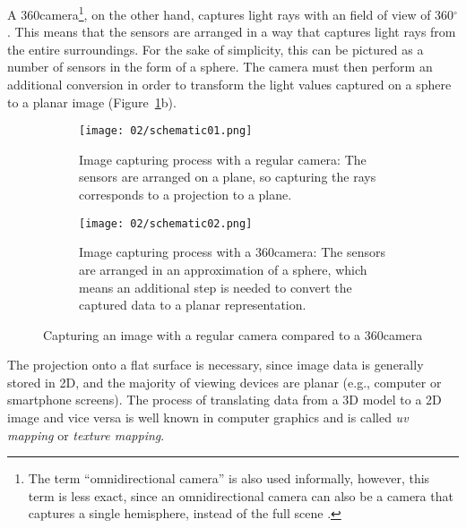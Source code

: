 A 360\degree camera\footnote{The term ``omnidirectional camera'' is also used informally, however, this term is less exact, since an omnidirectional camera can also be a camera that captures a single hemisphere, instead of the full scene \cite{omnidir}.}, on the other hand, captures light rays with an field of view of 360$^{\circ}$. This means that the sensors are arranged in a way that captures light rays from the entire surroundings. For the sake of simplicity, this can be pictured as a number of sensors in the form of a sphere\footnotemark. The camera must then perform an additional conversion in order to transform the light values captured on a sphere to a planar image (Figure~\ref{fig:cameras}b). \cite{omnidir}


\begin{figure}
\centering
    \begin{subfigure}[t]{0.9\textwidth}            
            \centering
            \texttt{[image: 02/schematic01.png]}
            \caption{Image capturing process with a regular camera: The sensors are arranged on a plane, so capturing the rays corresponds to a projection to a plane.}
    \end{subfigure}
    \begin{subfigure}[t]{0.9\textwidth}
            \centering
            \texttt{[image: 02/schematic02.png]}
            \caption{Image capturing process with a 360\degree camera: The sensors are arranged in an approximation of a sphere, which means an additional step is needed to convert the captured data to a planar representation.}
    \end{subfigure}
    \caption{Capturing an image with a regular camera compared to a 360\degree camera}\label{fig:cameras}
\end{figure}

The projection onto a flat surface is necessary, since image data is generally stored in 2D, and the majority of viewing devices are planar (e.g., computer or smartphone screens). The process of translating data from a 3D model to a 2D image and vice versa is well known in computer graphics and is called \emph{uv mapping} or \emph{texture mapping}.


